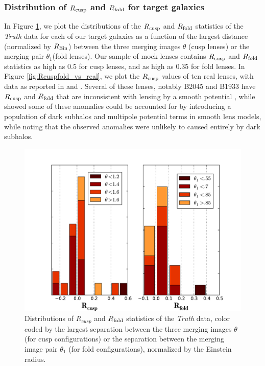 \subsubsection{Distribution of $R_{\rm{cusp}}$ and $R_{\rm{fold}}$ for target galaxies}
In Figure \ref{fig:Rcuspfold_dis}, we plot the distributions of the $R_{\rm{cusp}}$ and $R_{\rm{fold}}$ statistics of the \textit{Truth} data for each of our target galaxies as a function of the largest distance (normalized by $R_{\rm{Ein}}$) between the three merging images $\theta$ (cusp lenses) or the merging pair $\theta_1$(fold lenses). Our sample of mock lenses contains $R_{\rm{cusp}}$ and $R_{\rm{fold}}$ statistics as high as 0.5 for cusp lenses, and as high as 0.35 for fold lenses.
In Figure \ref{fig:Rcuspfold_vs_real}, we plot the $R_{\rm{cusp}}$ values of ten real lenses, with data as reported in \cite{KGP03} and \cite{Xuetal2015}. Several of these lenses, notably B2045 and B1933 have $R_{\rm{cusp}}$ and $R_{\rm{fold}}$ that are inconsistent with lensing by a smooth potential \cite{KGP03,McK++07}, while \cite{Xuetal2015} showed some of these anomalies could be accounted for by introducing a population of dark subhalos and multipole potential terms in smooth lens models, while noting that the observed anomalies were unlikely to caused entirely by dark subhalos. 
\begin{figure}
	\includegraphics[trim=0cm 0cm 0cm 0cm,clip,width=.48\textwidth]{./figures_sls/Rcuspfold_dis-eps-converted-to.pdf}
	\captionsetup{width=.45\textwidth}
	\caption{\label{fig:Rcuspfold_dis}Distributions of $R_{cusp}$ and $R_{\rm{fold}}$ statistics of the \textit{Truth} data, color coded by the largest separation between the three merging images $\theta$ (for cusp configurations) or the separation between the merging image pair $\theta_1$ (for fold configurations), normalized by the Einstein radius.} 
\end{figure}
